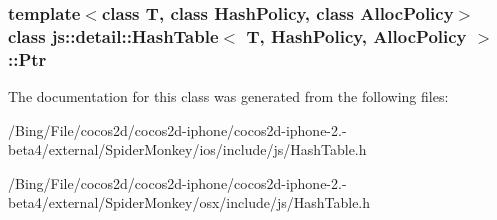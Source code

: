 \subsubsection*{template$<$class T, class Hash\-Policy, class Alloc\-Policy$>$ class js\-::detail\-::\-Hash\-Table$<$ T, Hash\-Policy, Alloc\-Policy $>$\-::\-Ptr}



The documentation for this class was generated from the following files\-:\begin{DoxyCompactItemize}
\item 
/\-Bing/\-File/cocos2d/cocos2d-\/iphone/cocos2d-\/iphone-\/2.-\/beta4/external/\-Spider\-Monkey/ios/include/js/Hash\-Table.\-h\item 
/\-Bing/\-File/cocos2d/cocos2d-\/iphone/cocos2d-\/iphone-\/2.-\/beta4/external/\-Spider\-Monkey/osx/include/js/Hash\-Table.\-h\end{DoxyCompactItemize}
